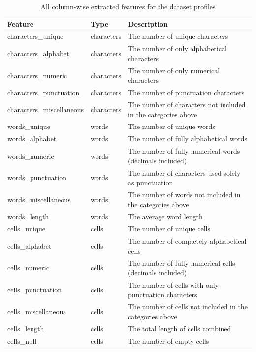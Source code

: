 \begin{table}[H]
\centering
\begin{adjustbox}{center}
	\begin{tabular}{lll}
		Feature                   & Type       & Description \\ \hline
		characters\_unique        & characters & The number of unique characters \\
		characters\_alphabet      & characters & The number of only alphabetical characters \\
		characters\_numeric       & characters & The number of only numerical characters \\
		characters\_punctuation   & characters & The number of punctuation characters \\
		characters\_miscellaneous & characters & The number of characters not included in the categories above \\
		words\_unique             & words      & The number of unique words \\
		words\_alphabet           & words      & The number of fully alphabetical words \\
		words\_numeric            & words      & The number of fully numerical words (decimals included) \\
		words\_punctuation        & words      & The number of characters used solely as punctuation \\
		words\_miscellaneous      & words      & The number of words not included in the categories above  \\
		words\_length             & words      & The average word length \\
		cells\_unique             & cells      & The number of unique cells \\
		cells\_alphabet           & cells      & The number of completely alphabetical cells \\
		cells\_numeric            & cells      & The number of fully numerical cells (decimals included) \\
		cells\_punctuation        & cells      & The number of cells with only punctuation characters \\
		cells\_miscellaneous      & cells      & The number of cells not included in the categories above\\
		cells\_length             & cells      & The total length of cells combined \\
		cells\_null               & cells      &  The number of empty cells 
	\end{tabular}
	\end{adjustbox}
	\caption{All column-wise extracted features for the dataset profiles}
	\label{tab:profilefeatures}
\end{table}

